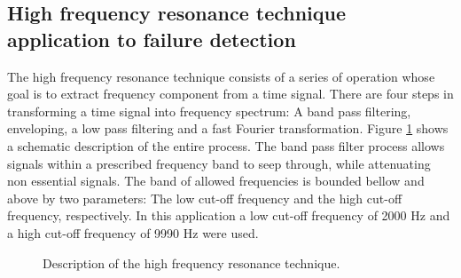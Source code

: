 \documentclass[../Main/thesis.tex]{subfiles}
\begin{document}
\subsection{High frequency resonance technique application to failure detection}
\label{sec:method}
The high frequency resonance technique consists of a series of operation whose goal is to extract frequency component from a time signal.
There are four steps in transforming a time signal into frequency spectrum: A band pass filtering, enveloping, a low pass filtering and a fast Fourier transformation.
Figure \ref{fig:fft-process} shows a schematic description of the entire process. 
\justify
The band pass filter process allows signals within a prescribed frequency band to seep through, while attenuating non essential signals. The band of allowed frequencies is bounded bellow and above by two parameters: The low cut-off frequency and the high cut-off frequency, respectively. In this application a low cut-off frequency of 2000 Hz and a high cut-off frequency of 9990 Hz were used.
\begin{figure}[H]
  \caption{Description of the high frequency resonance technique.}
   \label{fig:fft-process}
\end{figure}
\end{document}
